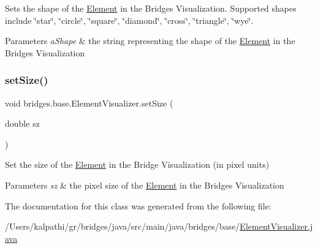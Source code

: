 Sets the shape of the \mbox{\hyperlink{classbridges_1_1base_1_1_element}{Element}} in the Bridges Visualization. Supported shapes include \char`\"{}star\char`\"{}, \char`\"{}circle\char`\"{}, \char`\"{}square\char`\"{}, \char`\"{}diamond\char`\"{}, \char`\"{}cross\char`\"{}, \char`\"{}triangle\char`\"{}, \char`\"{}wye\char`\"{}.


\begin{DoxyParams}{Parameters}
{\em a\+Shape} & the string representing the shape of the \mbox{\hyperlink{classbridges_1_1base_1_1_element}{Element}} in the Bridges Visualization \\
\hline
\end{DoxyParams}
\mbox{\label{classbridges_1_1base_1_1_element_visualizer_aba410184f7df495594fc1fa7948335a5}} 
\subsubsection{\texorpdfstring{setSize()}{setSize()}}
{\footnotesize\ttfamily void bridges.\+base.\+Element\+Visualizer.\+set\+Size (\begin{DoxyParamCaption}\item[{double}]{sz }\end{DoxyParamCaption})}

Set the size of the \mbox{\hyperlink{classbridges_1_1base_1_1_element}{Element}} in the Bridge Visualization (in pixel units)


\begin{DoxyParams}{Parameters}
{\em sz} & the pixel size of the \mbox{\hyperlink{classbridges_1_1base_1_1_element}{Element}} in the Bridges Visualization \\
\hline
\end{DoxyParams}


The documentation for this class was generated from the following file\+:\begin{DoxyCompactItemize}
\item 
/\+Users/kalpathi/gr/bridges/java/src/main/java/bridges/base/\mbox{\hyperlink{_element_visualizer_8java}{Element\+Visualizer.\+java}}\end{DoxyCompactItemize}
